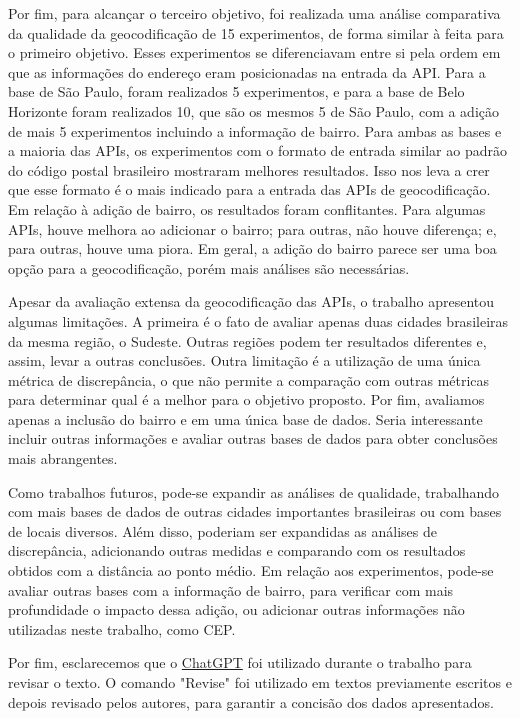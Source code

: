 Por fim, para alcançar o terceiro objetivo, foi realizada uma análise comparativa da qualidade da geocodificação de 15 experimentos, de forma similar à feita para o primeiro objetivo. Esses experimentos se diferenciavam entre si pela ordem em que as informações do endereço eram posicionadas na entrada da API. Para a base de São Paulo, foram realizados 5 experimentos, e para a base de Belo Horizonte foram realizados 10, que são os mesmos 5 de São Paulo, com a adição de mais 5 experimentos incluindo a informação de bairro. Para ambas as bases e a maioria das APIs, os experimentos com o formato de entrada similar ao padrão do código postal brasileiro mostraram melhores resultados. Isso nos leva a crer que esse formato é o mais indicado para a entrada das APIs de geocodificação. Em relação à adição de bairro, os resultados foram conflitantes. Para algumas APIs, houve melhora ao adicionar o bairro; para outras, não houve diferença; e, para outras, houve uma piora. Em geral, a adição do bairro parece ser uma boa opção para a geocodificação, porém mais análises são necessárias.

Apesar da avaliação extensa da geocodificação das APIs, o trabalho apresentou algumas limitações. A primeira é o fato de avaliar apenas duas cidades brasileiras da mesma região, o Sudeste. Outras regiões podem ter resultados diferentes e, assim, levar a outras conclusões. Outra limitação é a utilização de uma única métrica de discrepância, o que não permite a comparação com outras métricas para determinar qual é a melhor para o objetivo proposto. Por fim, avaliamos apenas a inclusão do bairro e em uma única base de dados. Seria interessante incluir outras informações e avaliar outras bases de dados para obter conclusões mais abrangentes.

Como trabalhos futuros, pode-se expandir as análises de qualidade, trabalhando com mais bases de dados de outras cidades importantes brasileiras ou com bases de locais diversos. Além disso, poderiam ser expandidas as análises de discrepância, adicionando outras medidas e comparando com os resultados obtidos com a distância ao ponto médio. Em relação aos experimentos, pode-se avaliar outras bases com a informação de bairro, para verificar com mais profundidade o impacto dessa adição, ou adicionar outras informações não utilizadas neste trabalho, como CEP.

Por fim, esclarecemos que o \href{https://chat.openai.com/auth/login?next=%2F}{ChatGPT} foi utilizado durante o trabalho para revisar o texto. O comando "Revise" foi utilizado em textos previamente escritos e depois revisado pelos autores, para garantir a concisão dos dados apresentados. 
 
